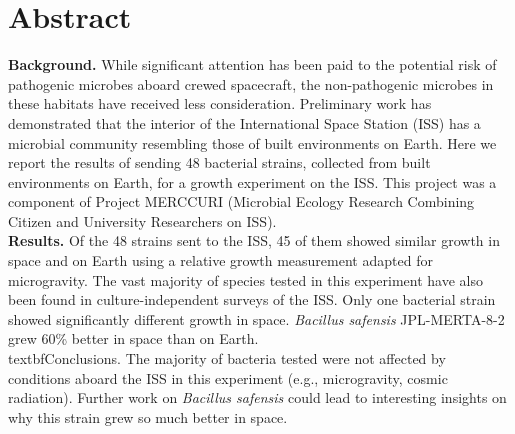 \section{Abstract}

\textbf{Background.} While significant attention has been paid to the potential risk of pathogenic microbes aboard crewed spacecraft, the non-pathogenic microbes in these habitats have received less consideration. Preliminary work has demonstrated that the interior of the International Space Station (ISS) has a microbial community resembling those of built environments on Earth. Here we report the results of sending 48 bacterial strains, collected from built environments on Earth, for a growth experiment on the ISS. This project was a component of Project MERCCURI (Microbial Ecology Research Combining Citizen and University Researchers on ISS).\\
\textbf{Results.} Of the 48 strains sent to the ISS, 45 of them showed similar growth in space and on Earth using a relative growth measurement adapted for microgravity. The vast majority of species tested in this experiment have also been found in culture-independent surveys of the ISS. Only one bacterial strain showed significantly different growth in space. \textit{Bacillus safensis} JPL-MERTA-8-2 grew 60\% better in space than on Earth.\\
textbf{Conclusions.} The majority of bacteria tested were not affected by conditions aboard the ISS in this experiment (e.g., microgravity, cosmic radiation). Further work on \textit{Bacillus safensis} could lead to interesting insights on why this strain grew so much better in space.